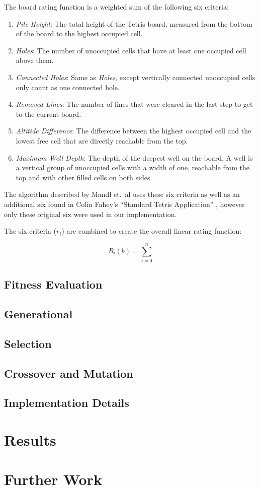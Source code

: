 \documentclass[a4paper,12pt]{article}
\begin{document}
The board rating function is a weighted sum of the following six criteria:

\begin{enumerate}
  \item \emph{Pile Height}: The total height of the Tetris board, measured from
      the bottom of the board to the highest occupied cell.
  \item \emph{Holes}: The number of unoccupied cells that have at least one
      occupied cell above them.
  \item \emph{Connected Holes}: Same as \emph{Holes}, except vertically
      connected unoccupied cells only count as one connected hole.
  \item \emph{Removed Lines}: The number of lines that were cleared in the last
      step to get to the current board.
  \item \emph{Altitide Difference}: The difference between the highest occupied
      cell and the lowest free cell that are directly reachable from the top.
  \item \emph{Maximum Well Depth}: The depth of the deepest well on the board.
      A well is a vertical group of unoccupied cells with a width of one,
      reachable from the top and with other filled cells on both sides.
\end{enumerate}

The algorithm described by Mandl et.\ al uses these six criteria as well as
an additional six found in Colin Fahey's ``Standard Tetris Application''
\cite{TetrisAI}, however only these original six were used in our
implementation.

The six criteria ($r_i$) are combined to create the overall linear rating
function:

\begin{equation}
  R_l(b) = \sum^n_{i=0}
\end{equation}



\subsection{Fitness Evaluation}
\subsection{Generational}
\subsection{Selection}
\subsection{Crossover and Mutation}
\subsection{Implementation Details}

\section{Results}

\section{Further Work}


\end{document}
